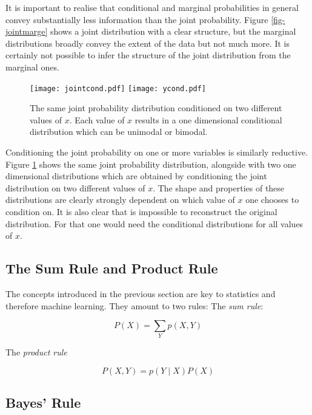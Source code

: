 It is important to realise that conditional and marginal probabilities in general convey substantially less information than the joint probability. Figure
\ref{fig-jointmarge} shows a joint distribution with a clear structure, but the marginal distributions broadly convey the extent of the data but not much more.
It is certainly not possible to infer the structure of the joint distribution from the marginal ones.

\begin{figure}[!h]
\begin{center}
\texttt{[image: jointcond.pdf]}
\texttt{[image: ycond.pdf]}
\end{center}
\caption{The same joint probability distribution conditioned on two different values of $x$. Each value of $x$ results in a one dimensional conditional distribution which can be unimodal or bimodal.}
\label{fig-jointcond}
\end{figure}

Conditioning the joint probability on one or more variables is similarly reductive.  Figure \ref{fig-jointcond} shows the same joint probability distribution, alongside with two one dimensional distributions which are obtained by conditioning the joint distribution on two different values
of $x$. The shape and properties of these distributions are clearly strongly dependent on which value of $x$ one chooses to condition on. It is also clear
that is impossible to reconstruct the original distribution. For that one would need the conditional distributions for all values of $x$.
  

\subsection{The Sum Rule and Product Rule}

The concepts introduced in the previous section are key to statistics and therefore machine learning. They amount to two rules:
The \emph{sum rule}:

\begin{equation}
P(X) = \sum_Y p(X,Y)
\label{eq-sum}
\end{equation}

The \emph{product rule}

\begin{equation}
P(X, Y) = p(Y \mid X)P(X)
\label{eq-product}
\end{equation}


\subsection{Bayes' Rule}
\label{sec-bayes}

